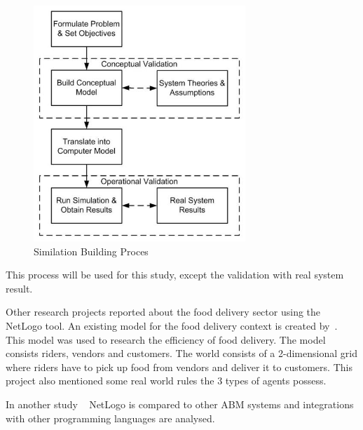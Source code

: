 \begin{figure}
    \centering
    \includegraphics[width=8cm]{sections/pics/Steps_To_Build_Simulation}
    \caption{Similation Building Proces}
    \label{fig:steps_simulation}
\end{figure}

This process will be used for this study, except the validation with real system result.

Other research projects reported about the food delivery sector using the NetLogo tool.
An existing model for the food delivery context is created by~\cite{ismail2024software}.
This model was used to research the efficiency of food delivery.
The model consists riders, vendors and customers.
The world consists of a 2-dimensional grid where riders have to pick up food from vendors and deliver it to customers.
This project also mentioned some real world rules the 3 types of agents possess.

In another study ~\cite{antelmi2024reliable} NetLogo is compared to other ABM systems and integrations with other programming languages are analysed.





